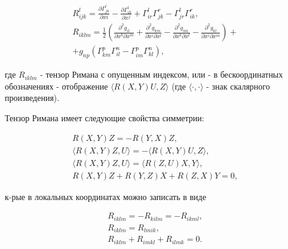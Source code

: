 \documentclass[10pt]{article}
\begin{document}
\[

\begin{gathered}

R_{i j k}^{l}=\frac{\partial \Gamma_{j k}^{l}}{\partial x i}-\frac{\partial \Gamma_{i k}^{l}}{\partial x^{j}}+\Gamma_{i r}^{l} \Gamma_{j k}^{r}-\Gamma_{j r}^{l} \Gamma_{i k}^{r}, \\

R_{i k l m}=\frac{1}{2}\left(\frac{\partial^{2} g_{i l}}{\partial x^{k} \partial x^{m}}+\frac{\partial^{2} g_{k m}}{\partial x^{i} \partial x^{l}}-\frac{\partial^{2} g_{i m}}{\partial x^{k} \partial x^{l}}-\frac{\partial^{2} g_{k l}}{\partial x^{i} \partial x^{m}}\right)+ \\

+g_{n p}\left(\Gamma_{k m}^{p} \Gamma_{i l}^{n}-\Gamma_{i m}^{p} \Gamma_{k l}^{n}\right),

\end{gathered}

\]



где $R_{i k l m}$ - тензор Римана с опущенным индексом, или - в бескоординатных обозначениях - отображение $\langle R(X, Y) U, Z\rangle$ (где $\langle\cdot, \cdot\rangle$ - знак скалярного произведения).



Тензор Римана имеет следующие свойства симметрии:



\[

\begin{gathered}

R(X, Y) Z=-R(Y, X) Z, \\

\langle R(X, Y) Z, U\rangle=-\langle R(X, Y) U, Z\rangle, \\

\langle R(X, Y) Z, U\rangle=\langle R(Z, U) X, Y\rangle, \\

R(X, Y) Z+R(Y, Z) X+R(Z, X) Y=0,

\end{gathered}

\]



к-рые в локальных координатах можно записать в виде



\[

\begin{gathered}

R_{i k l m}=-R_{k i l m}=-R_{i k m l}, \\

R_{i k l m}=R_{l m i k}, \\

R_{i k l m}+R_{i m k l}+R_{i l m k}=0 .

\end{gathered}

\]
\end{document}
